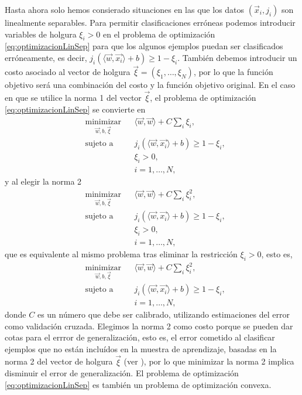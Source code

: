 \documentclass[letterpaper,12pt]{book}
\begin{document}
Hasta ahora solo hemos consierado situaciones en las que los datos $(\vec{x}_i,j_i)$ son linealmente separables. Para permitir clasificaciones erróneas podemos introducir variables de holgura $\xi_i>0$ en el problema de optimización \ref{eq:optimizacionLinSep} para que los algunos ejemplos puedan ser clasificados erróneamente, es decir,  $j_i(\langle \vec{w}, \vec{x_i}\rangle + b)\geq 1-\xi_i$. También debemos introducir un costo asociado al vector de holgura $\vec{\xi}=(\xi_1,\dots,\xi_N)$, por lo que la función objetivo será una combinación del costo y la función objetivo original. En el caso en que se utilice la norma 1 del vector $\vec{\xi}$, el problema de optimización \ref{eq:optimizacionLinSep} se convierte en 
\begin{equation}
  \begin{aligned}
    & \underset{\vec{w},b, \vec{\xi}}{\text{minimizar}}
    & & \langle \vec{w}, \vec{w} \rangle +C\sum_i\xi_i,\\
    & \text{sujeto a}
    & & j_i(\langle \vec{w}, \vec{x_i}\rangle + b)\geq 1-\xi_i, \\
    & & & \xi_i>0, \\
    & & & i = 1, \ldots, N,
  \end{aligned}
\end{equation}
y al elegir la norma 2
\begin{equation}
  \begin{aligned}
    & \underset{\vec{w},b, \vec{\xi}}{\text{minimizar}}
    & & \langle \vec{w}, \vec{w} \rangle +C\sum_i\xi_i^2,\\
    & \text{sujeto a}
    & & j_i(\langle \vec{w}, \vec{x_i}\rangle + b)\geq 1-\xi_i, \\
    & & & \xi_i>0, \\
    & & & i = 1, \ldots, N,
  \end{aligned}
\end{equation}
que es equivalente al mismo problema tras eliminar la restricción $\xi_i>0$, esto es,
\begin{equation}\label{eq:problemaOptimizacionPrimalMSV}
  \begin{aligned}
    & \underset{\vec{w},b, \vec{\xi}}{\text{minimizar}}
    & & \langle \vec{w}, \vec{w} \rangle +C\sum_i\xi_i^2,\\
    & \text{sujeto a}
    & & j_i(\langle \vec{w}, \vec{x_i}\rangle + b)\geq 1-\xi_i, \\
    & & & i = 1, \ldots, N,
  \end{aligned}
\end{equation}
donde $C$ es un número que debe ser calibrado, utilizando estimaciones del error como validación cruzada. Elegimos la norma 2 como costo porque se pueden dar cotas para el errror de generalización, esto es, el error cometido al clasificar ejemplos que no están incluídos en la muestra de aprendizaje, basadas en la norma 2 del vector de holgura $\vec{\xi}$ (ver \cite{cristianini_introduction_2000}), por lo que minimizar la norma 2 implica disminuir el error de generalización. El problema de optimización \ref{eq:optimizacionLinSep} es también un problema de optimización convexa.
\end{document}
